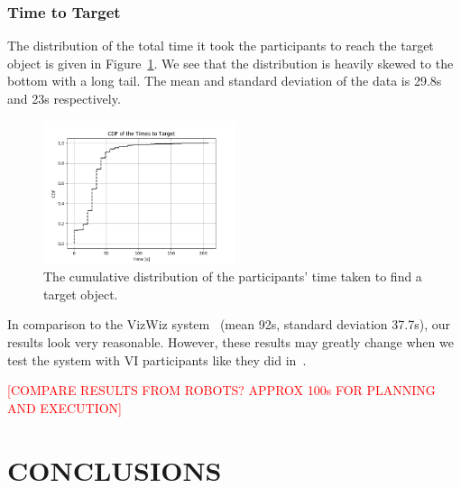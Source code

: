 \documentclass[a4paper, twoside]{article}
\newcommand{\todo}[1]{\textcolor{red}{[#1]}}
\begin{document}
\subsubsection{Time to Target}

\noindent The distribution of the total time it took the participants to reach the target object is given in Figure~\ref{fig:time-participants}. We see that the distribution is heavily skewed to the bottom with a long tail. The mean and standard deviation of the data is 29.8s and 23s respectively. %

\begin{figure}
  \centering
  \includegraphics[width=0.5\textwidth]{figures/cdf_total_time.png}
  \caption{The cumulative distribution of the participants' time taken to find a target object. }\label{fig:time-participants}
\end{figure}

In comparison to the VizWiz system~\cite{bigham2010vizwiz} (mean 92s, standard deviation 37.7s), our results look very reasonable. However, these results may greatly change when we test the system with VI participants like they did in~\cite{bigham2010vizwiz}.

\todo{COMPARE RESULTS FROM ROBOTS? APPROX 100s FOR PLANNING AND EXECUTION}

\section{\uppercase{Conclusions}}\label{sec:conclusion}
\end{document}
